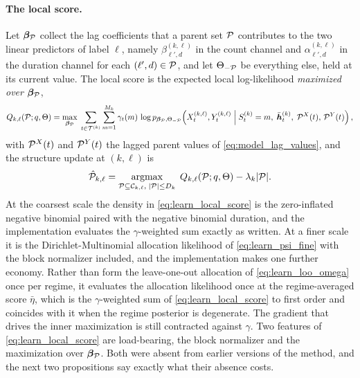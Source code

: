 \paragraph{The local score.}
Let ${\boldsymbol{\beta}}_{\mathcal{P}}$ collect the lag coefficients that a parent set ${\mathcal{P}}$ contributes to the two linear
predictors of label $\ell$, namely $\beta_{\ell',d}^{(k,\ell)}$ in the count channel and
$\alpha_{\ell',d}^{(k,\ell)}$ in the duration channel for each $(\ell',d) \in {\mathcal{P}}$, and let
$\Theta_{-{\mathcal{P}}}$ be everything else, held at its current value. The local score is the expected
local log-likelihood \emph{maximized over} ${\boldsymbol{\beta}}_{\mathcal{P}}$,
\begin{align}
Q_{k,\ell}({\mathcal{P}}; q,\Theta)
=
\max_{{\boldsymbol{\beta}}_{\mathcal{P}}}
\;
\sum_{t \in {\mathcal{T}}^{(k)}} \sum_{m=1}^{M_k}
\gamma_t(m)\,
\log p_{{\boldsymbol{\beta}}_{\mathcal{P}},\Theta_{-{\mathcal{P}}}}\!\left(
X_t^{(k,\ell)}, Y_t^{(k,\ell)}
\;\middle|\;
S_t^{(k)}=m,\; \bar{{\bm{h}}}_t^{(k)},\; {\mathcal{P}}^{X}(t),\, {\mathcal{P}}^{Y}(t)
\right),
\label{eq:learn_local_score}
\end{align}
with ${\mathcal{P}}^{X}(t)$ and ${\mathcal{P}}^{Y}(t)$ the lagged parent values of \cref{eq:model_lag_values}, and the
structure update at $(k,\ell)$ is
\begin{align}
\hat{{\mathcal{P}}}_{k,\ell}
=
\operatorname*{argmax}_{{\mathcal{P}} \subseteq {\mathcal{C}}_{k,\ell},\; |{\mathcal{P}}| \le D_k}
\;
Q_{k,\ell}({\mathcal{P}}; q,\Theta) - \lambda_k |{\mathcal{P}}|.
\label{eq:learn_local_update}
\end{align}
At the coarsest scale the density in \cref{eq:learn_local_score} is the zero-inflated negative
binomial paired with the negative binomial duration, and the implementation evaluates the
$\gamma$-weighted sum exactly as written. At a finer scale it is the Dirichlet-Multinomial
allocation likelihood of \cref{eq:learn_psi_fine} with the block normalizer included, and the
implementation makes one further economy. Rather than form the leave-one-out allocation of
\cref{eq:learn_loo_omega} once per regime, it evaluates the allocation likelihood once at the
regime-averaged score $\bar{\eta}$, which is the $\gamma$-weighted sum of
\cref{eq:learn_local_score} to first order and coincides with it when the regime posterior is
degenerate. The gradient that drives the inner maximization is still contracted against $\gamma$.
Two features of \cref{eq:learn_local_score} are load-bearing, the block normalizer and the
maximization over ${\boldsymbol{\beta}}_{\mathcal{P}}$. Both were absent from earlier versions of the method, and the next
two propositions say exactly what their absence costs.

